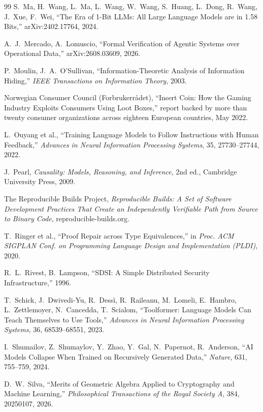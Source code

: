 \begin{thebibliography}{99}
S.~Ma, H.~Wang, L.~Ma, L.~Wang, W.~Wang, S.~Huang, L.~Dong, R.~Wang, J.~Xue, F.~Wei, ``The Era of 1-Bit LLMs: All Large Language Models are in 1.58 Bits,'' arXiv:2402.17764, 2024.

A.~J.~Mercado, A.~Lomuscio, ``Formal Verification of Agentic Systems over Operational Data,'' arXiv:2608.03609, 2026.

P.~Moulin, J.~A.~O'Sullivan, ``Information-Theoretic Analysis of Information Hiding,'' \textit{IEEE Transactions on Information Theory}, 2003.

Norwegian Consumer Council (Forbrukerrådet), ``Insert Coin: How the Gaming Industry Exploits Consumers Using Loot Boxes,'' report backed by more than twenty consumer organizations across eighteen European countries, May 2022.

L.~Ouyang et al., ``Training Language Models to Follow Instructions with Human Feedback,'' \textit{Advances in Neural Information Processing Systems}, 35, 27730--27744, 2022.

J.~Pearl, \textit{Causality: Models, Reasoning, and Inference}, 2nd ed., Cambridge University Press, 2009.

The Reproducible Builds Project, \textit{Reproducible Builds: A Set of Software Development Practices That Create an Independently Verifiable Path from Source to Binary Code}, reproducible-builds.org.

T.~Ringer et al., ``Proof Repair across Type Equivalences,'' in \textit{Proc. ACM SIGPLAN Conf. on Programming Language Design and Implementation (PLDI)}, 2020.

R.~L.~Rivest, B.~Lampson, ``SDSI: A Simple Distributed Security Infrastructure,'' 1996.

T.~Schick, J.~Dwivedi-Yu, R.~Dessì, R.~Raileanu, M.~Lomeli, E.~Hambro, L.~Zettlemoyer, N.~Cancedda, T.~Scialom, ``Toolformer: Language Models Can Teach Themselves to Use Tools,'' \textit{Advances in Neural Information Processing Systems}, 36, 68539--68551, 2023.

I.~Shumailov, Z.~Shumaylov, Y.~Zhao, Y.~Gal, N.~Papernot, R.~Anderson, ``AI Models Collapse When Trained on Recursively Generated Data,'' \textit{Nature}, 631, 755--759, 2024.

D.~W.~Silva, ``Merits of Geometric Algebra Applied to Cryptography and Machine Learning,'' \textit{Philosophical Transactions of the Royal Society A}, 384, 20250107, 2026.


\end{thebibliography}
